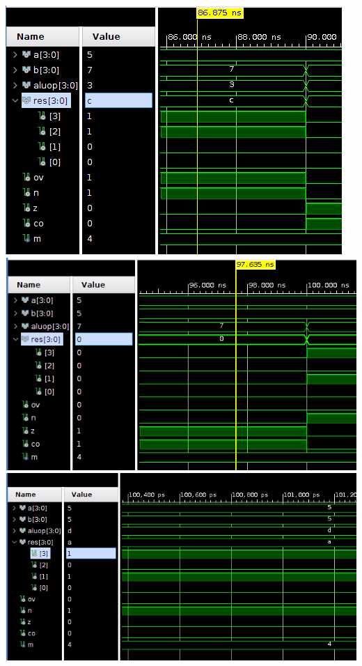 \documentclass[12pt,executivepaper]{article}
\begin{document}
\begin{center}
    \includegraphics[scale=0.666]{imgs/nueve.png}\\
    \includegraphics[scale=0.666]{imgs/diez.png}\\
    \includegraphics[scale=0.666]{imgs/once.png}
\end{center}
\end{document}
